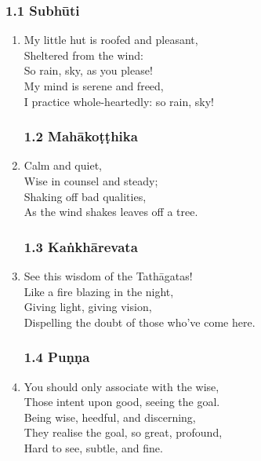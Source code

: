 \documentclass[10pt, openany]{book}
\begin{document}
\subsubsection*{1.1 Subhūti}

\vspace{0.78em}

\begin{enumerate}

\item My little hut is roofed and pleasant, \\
Sheltered from the wind:\\
So rain, sky, as you please!\\
My mind is serene and freed,\\
I practice whole-heartedly: so rain, sky!

\subsubsection*{1.2 Mahākoṭṭhika}

\item Calm and quiet,\\
Wise in counsel and steady;\\
Shaking off bad qualities,\\
As the wind shakes leaves off a tree.

\subsubsection*{1.3 Kaṅkhārevata}

\item See this wisdom of the Tathāgatas!\\
Like a fire blazing in the night,\\
Giving light, giving vision,\\
Dispelling the doubt of those who’ve come here.

\subsubsection*{1.4 Puṇṇa}

\item You should only associate with the wise, \\
Those intent upon good, seeing the goal.\\
Being wise, heedful, and discerning,\\
They realise the goal, so great, profound,\\
Hard to see, subtle, and fine.


\end{enumerate}
\end{document}
